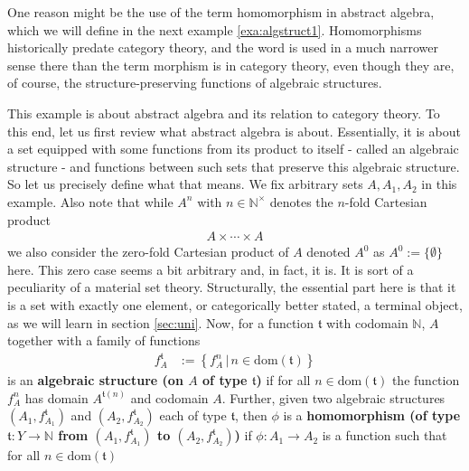 One reason might be the use of the term homomorphism in abstract algebra, which we will define in the next example \ref{exa:algstruct1}.
Homomorphisms historically predate category theory, and the word is used in a much narrower sense there than the term morphism is in category theory, even though they are, of course, the structure-preserving functions of algebraic structures.
\\
\begin{exa}
\label{exa:algstruct1}
This example is about abstract algebra and its relation to category theory.
To this end, let us first review what abstract algebra is about.
Essentially, it is about a set equipped with some functions from its product to itself - called an algebraic structure - and functions between such sets that preserve this algebraic structure.
So let us precisely define what that means.
We fix arbitrary sets $A,A_{1},A_{2}$ in this example.
Also note that while $A^{n}$ with $n \in \mathbb{N}^{\times}$ denotes the $n$-fold Cartesian product
\begin{align*}
  A
  \times
  \cdots
  \times
  A
\end{align*}
we also consider the zero-fold Cartesian product of $A$ denoted $A^{0}$ as $A^{0} := \lbrace \emptyset \rbrace$ here.
This zero case seems a bit arbitrary and, in fact, it is.
It is sort of a peculiarity of a material set theory.
Structurally, the essential part here is that it is a set with exactly one element, or categorically better stated, a terminal object, as we will learn in section \ref{sec:uni}.
Now, for a function $\mathfrak{t}$ with codomain $\mathbb{N}$, $A$ together with a family of functions
\begin{align*}
  f_{A}^{\mathfrak{t}}
  &:=
  \left\lbrace
      f_{A}^{n}
    \,
    \vert
    \,
      n
      \in
      \mathrm{dom}(\mathfrak{t})
  \right\rbrace
\end{align*}
is an \textbf{algebraic structure (on $A$ of type $\mathfrak{t}$)} if for all $n \in \mathrm{dom}(\mathfrak{t})$ the function $f_{A}^{n}$ has domain $A^{\mathfrak{t}(n)}$ and codomain $A$.
Further, given two algebraic structures $(A_{1},f_{A_{1}}^{\mathfrak{t}})$ and $(A_{2},f_{A_{2}}^{\mathfrak{t}})$ each of type $\mathfrak{t}$, then $\phi$ is a \textbf{homomorphism (of type $\mathfrak{t} \colon Y \rightarrow \mathbb{N}$ from $(A_{1},f_{A_{1}}^{\mathfrak{t}})$ to $(A_{2},f_{A_{2}}^{\mathfrak{t}})$)} if $\phi \colon A_{1} \rightarrow A_{2}$ is a function such that for all $n \in \mathrm{dom}(\mathfrak{t})$
\begin{align*}

\end{align*}
\end{exa}

